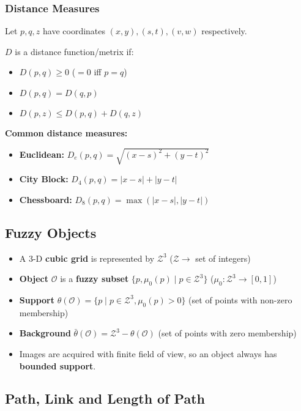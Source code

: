 \subsubsection*{Distance Measures}

Let $p, q, z$ have coordinates $(x, y), (s, t), (v, w)$ respectively.

$D$ is a distance function/metrix if:

\begin{itemize}
  \item $D(p, q) \geq 0$ ($= 0$ iff $p = q$)
  \item $D(p, q) = D(q, p)$
  \item $D(p, z) \leq D(p, q) + D(q, z)$
\end{itemize}

\textbf{Common distance measures:}

\begin{itemize}
  \item \textbf{Euclidean:} $D_e(p, q) = \sqrt{(x - s)^2 + (y - t)^2}$
  \item \textbf{City Block:} $D_4(p, q) = |x - s| + |y - t|$
  \item \textbf{Chessboard:} $D_8(p, q) = \max(|x - s|, |y - t|)$
\end{itemize}

\subsection*{Fuzzy Objects}

\begin{itemize}
  \item A 3-D \textbf{cubic grid} is represented by $\mathcal{Z}^3$ ($\mathcal{Z} \rightarrow$ set of integers)
  \item \textbf{Object} $\mathcal{O}$ is a \textbf{fuzzy subset} $\{p, \mu_0(p) \; | \; p \in \mathcal{Z}^3\}$ ($\mu_0 : \mathcal{Z}^3 \rightarrow [0, 1]$)
  \item \textbf{Support} $\theta(\mathcal{O}) = \{p \; | \; p \in \mathcal{Z}^3, \mu_0(p) > 0\}$ (set of points with non-zero membership)
  \item \textbf{Background} $\bar{\theta}(\mathcal{O}) = \mathcal{Z}^3 - \theta(\mathcal{O})$ (set of points with zero membership)
  \item Images are acquired with finite field of view, so an object always has \textbf{bounded support}.
\end{itemize}

\subsection*{Path, Link and Length of Path}

